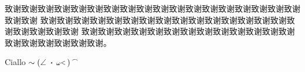 \setlength{\headheight}{13pt}

\songti
致谢致谢致谢致谢致谢致谢致谢致谢致谢致谢致谢致谢致谢致谢致谢致谢致谢致谢致谢致谢
致谢致谢致谢致谢致谢致谢致谢致谢致谢致谢致谢致谢致谢致谢致谢致谢致谢致谢致谢致谢
致谢致谢致谢致谢致谢致谢致谢致谢致谢致谢致谢致谢致谢致谢致谢致谢致谢致谢致谢。

Ciallo $\sim (\angle~\pmb{\cdot}\,{\scriptstyle \omega}\raisebox{0.2ex}{$\scriptstyle <$}\,)\begin{smallmatrix} \frown \\ \vphantom{a} \end{smallmatrix}$